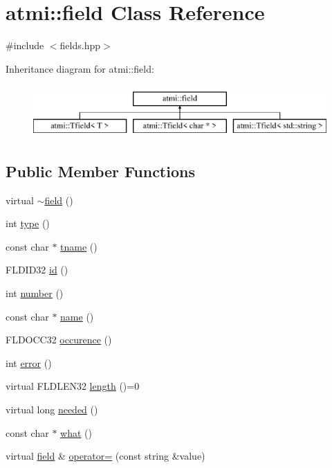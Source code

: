 \hypertarget{classatmi_1_1field}{\section{atmi\+:\+:field Class Reference}
\label{classatmi_1_1field}
}


{\ttfamily \#include $<$fields.\+hpp$>$}

Inheritance diagram for atmi\+:\+:field\+:\begin{figure}[H]
\begin{center}
\leavevmode
\includegraphics[height=2.000000cm]{classatmi_1_1field}
\end{center}
\end{figure}
\subsection*{Public Member Functions}
\begin{DoxyCompactItemize}
\item 
virtual \hyperlink{classatmi_1_1field_a6f91cba3fca0a77fb7ad229187d689b9}{$\sim$field} ()
\item 
int \hyperlink{classatmi_1_1field_a717c701f07a784f471abb44d7bc95048}{type} ()
\item 
const char $\ast$ \hyperlink{classatmi_1_1field_a7d6260dd6f7c3c44de29190c2dfd546e}{tname} ()
\item 
F\+L\+D\+I\+D32 \hyperlink{classatmi_1_1field_a29384f1a15dc298b8fe4a41aa0746430}{id} ()
\item 
int \hyperlink{classatmi_1_1field_aa71d28f3df8490e9ed016607f857fae1}{number} ()
\item 
const char $\ast$ \hyperlink{classatmi_1_1field_a0fbc5a958a0af8286e339b088ee69bc8}{name} ()
\item 
F\+L\+D\+O\+C\+C32 \hyperlink{classatmi_1_1field_a161b9b7037c49fbcf86518fcb35e779c}{occurence} ()
\item 
int \hyperlink{classatmi_1_1field_a6d8db988f58f3779b0ef528a11b3466f}{error} ()
\item 
virtual F\+L\+D\+L\+E\+N32 \hyperlink{classatmi_1_1field_a296771293135085d91aa9aefd108d44d}{length} ()=0
\item 
virtual long \hyperlink{classatmi_1_1field_aef2940ef13d554b2a0090ea4052529d8}{needed} ()
\item 
const char $\ast$ \hyperlink{classatmi_1_1field_a396b41ad5ae2b1df362e446c5f090640}{what} ()
\item 
virtual \hyperlink{classatmi_1_1field}{field} \& \hyperlink{classatmi_1_1field_ac032afae0c1ebfc606f047ce1a32ac58}{operator=} (const string \&value)
\end{DoxyCompactItemize}
